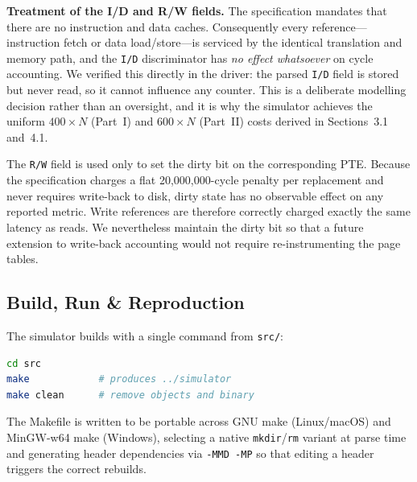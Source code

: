 \documentclass[11pt,a4paper]{article}
\begin{document}
\noindent\textbf{Treatment of the I/D and R/W fields.}
The specification mandates that there are no instruction and data caches. Consequently every reference---instruction fetch or data load/store---is serviced by the identical translation and memory path, and the \texttt{I/D} discriminator has \emph{no effect whatsoever} on cycle accounting. We verified this directly in the driver: the parsed \texttt{I/D} field is stored but never read, so it cannot influence any counter. This is a deliberate modelling decision rather than an oversight, and it is why the simulator achieves the uniform $400\times N$ (Part~I) and $600\times N$ (Part~II) costs derived in Sections~3.1 and~4.1.

The \texttt{R/W} field is used only to set the dirty bit on the corresponding PTE. Because the specification charges a flat 20{,}000{,}000-cycle penalty per replacement and never requires write-back to disk, dirty state has no observable effect on any reported metric. Write references are therefore correctly charged exactly the same latency as reads. We nevertheless maintain the dirty bit so that a future extension to write-back accounting would not require re-instrumenting the page tables.

\subsection{Build, Run \& Reproduction}
The simulator builds with a single command from \texttt{src/}:
\begin{lstlisting}[language=bash,caption={Build the simulator},captionpos=b]
cd src
make            # produces ../simulator
make clean      # remove objects and binary
\end{lstlisting}
The Makefile is written to be portable across GNU make (Linux/macOS) and MinGW-w64 make (Windows), selecting a native \texttt{mkdir}/\texttt{rm} variant at parse time and generating header dependencies via \texttt{-MMD -MP} so that editing a header triggers the correct rebuilds.
\end{document}
